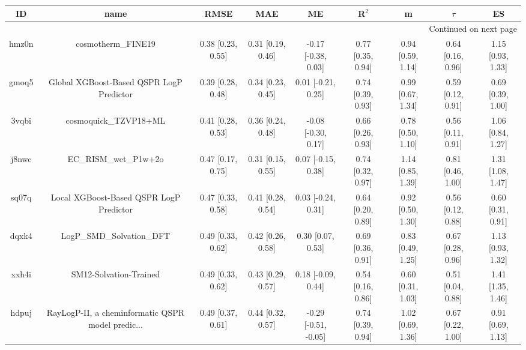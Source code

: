 \documentclass{article}
\begin{document}
\begin{center}
\scriptsize
\begin{longtable}{|ccccccccc|}
\toprule
    ID &                                               name &               RMSE &                MAE &                    ME &              R$^2$ &                    m &               $\tau$ &                    ES \\
\midrule
\endhead
\midrule
\multicolumn{9}{r}{{Continued on next page}} \\
\midrule
\endfoot

\bottomrule
\endlastfoot
 hmz0n &                                 cosmotherm\_FINE19 &  0.38 [0.23, 0.55] &  0.31 [0.19, 0.46] &   -0.17 [-0.38, 0.03] &  0.77 [0.35, 0.94] &    0.94 [0.59, 1.14] &    0.64 [0.16, 0.96] &     1.15 [0.93, 1.33] \\
 gmoq5 &           Global XGBoost-Based QSPR LogP Predictor &  0.39 [0.28, 0.48] &  0.34 [0.23, 0.45] &    0.01 [-0.21, 0.25] &  0.74 [0.39, 0.93] &    0.99 [0.67, 1.34] &    0.59 [0.12, 0.91] &     0.69 [0.39, 1.00] \\
 3vqbi &                              cosmoquick\_TZVP18+ML &  0.41 [0.28, 0.53] &  0.36 [0.24, 0.48] &   -0.08 [-0.30, 0.17] &  0.66 [0.26, 0.93] &    0.78 [0.50, 1.10] &    0.56 [0.11, 0.91] &     1.06 [0.84, 1.27] \\
 j8nwc &                              EC\_RISM\_wet\_P1w+2o &  0.47 [0.17, 0.75] &  0.31 [0.15, 0.55] &    0.07 [-0.15, 0.38] &  0.74 [0.32, 0.97] &    1.14 [0.85, 1.39] &    0.81 [0.46, 1.00] &     1.31 [1.08, 1.47] \\
 sq07q &            Local XGBoost-Based QSPR LogP Predictor &  0.47 [0.33, 0.58] &  0.41 [0.28, 0.54] &    0.03 [-0.24, 0.31] &  0.64 [0.20, 0.89] &    0.92 [0.50, 1.30] &    0.56 [0.12, 0.88] &     0.60 [0.31, 0.91] \\
 dqxk4 &                          LogP\_SMD\_Solvation\_DFT &  0.49 [0.33, 0.62] &  0.42 [0.26, 0.58] &     0.30 [0.07, 0.53] &  0.69 [0.36, 0.91] &    0.83 [0.49, 1.25] &    0.67 [0.28, 0.96] &     1.13 [0.93, 1.32] \\
 xxh4i &                             SM12-Solvation-Trained &  0.49 [0.33, 0.62] &  0.43 [0.29, 0.57] &    0.18 [-0.09, 0.44] &  0.54 [0.16, 0.86] &    0.60 [0.31, 1.03] &    0.51 [0.04, 0.88] &     1.41 [1.35, 1.46] \\
 hdpuj &  RayLogP-II, a cheminformatic QSPR model predic... &  0.49 [0.37, 0.61] &  0.44 [0.32, 0.57] &  -0.29 [-0.51, -0.05] &  0.74 [0.39, 0.94] &    1.02 [0.69, 1.36] &    0.67 [0.22, 1.00] &     0.91 [0.69, 1.13] \\

\end{longtable}
\end{center}
\end{document}
